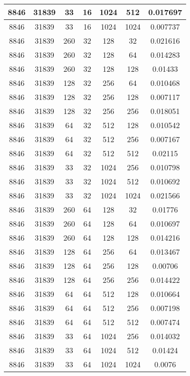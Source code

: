 \documentclass[9pt]{article}
\begin{document}
\begin{tabular}{|c|c|c|c|c|c|c| }
\hline
8846  & 31839  & 33  & 16  & 1024  & 512  & 0.017697 \\
\hline
8846  & 31839  & 33  & 16  & 1024  & 1024  & 0.007737 \\
\hline
8846  & 31839  & 260  & 32  & 128  & 32  & 0.021616 \\
\hline
8846  & 31839  & 260  & 32  & 128  & 64  & 0.014283 \\
\hline
8846  & 31839  & 260  & 32  & 128  & 128  & 0.01433 \\
\hline
8846  & 31839  & 128  & 32  & 256  & 64  & 0.010468 \\
\hline
8846  & 31839  & 128  & 32  & 256  & 128  & 0.007117 \\
\hline
8846  & 31839  & 128  & 32  & 256  & 256  & 0.018051 \\
\hline
8846  & 31839  & 64  & 32  & 512  & 128  & 0.010542 \\
\hline
8846  & 31839  & 64  & 32  & 512  & 256  & 0.007167 \\
\hline
8846  & 31839  & 64  & 32  & 512  & 512  & 0.02115 \\
\hline
8846  & 31839  & 33  & 32  & 1024  & 256  & 0.010798 \\
\hline
8846  & 31839  & 33  & 32  & 1024  & 512  & 0.010692 \\
\hline
8846  & 31839  & 33  & 32  & 1024  & 1024  & 0.021566 \\
\hline
8846  & 31839  & 260  & 64  & 128  & 32  & 0.01776 \\
\hline
8846  & 31839  & 260  & 64  & 128  & 64  & 0.010697 \\
\hline
8846  & 31839  & 260  & 64  & 128  & 128  & 0.014216 \\
\hline
8846  & 31839  & 128  & 64  & 256  & 64  & 0.013467 \\
\hline
8846  & 31839  & 128  & 64  & 256  & 128  & 0.00706 \\
\hline
8846  & 31839  & 128  & 64  & 256  & 256  & 0.014422 \\
\hline
8846  & 31839  & 64  & 64  & 512  & 128  & 0.010664 \\
\hline
8846  & 31839  & 64  & 64  & 512  & 256  & 0.007198 \\
\hline
8846  & 31839  & 64  & 64  & 512  & 512  & 0.007474 \\
\hline
8846  & 31839  & 33  & 64  & 1024  & 256  & 0.014032 \\
\hline
8846  & 31839  & 33  & 64  & 1024  & 512  & 0.01424 \\
\hline
8846  & 31839  & 33  & 64  & 1024  & 1024  & 0.0076 \\

\end{tabular}
\end{document}
